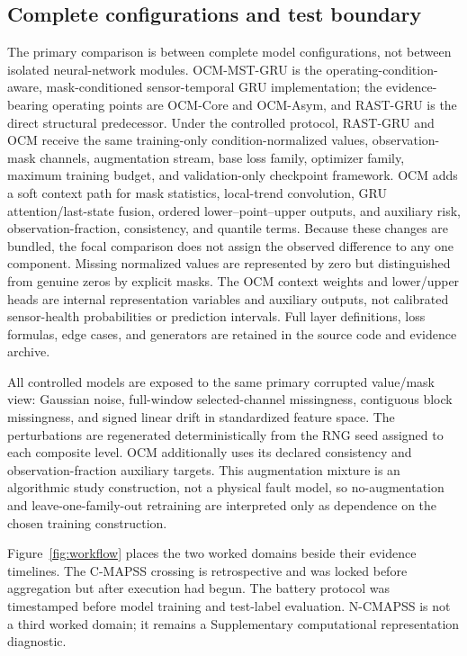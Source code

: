 \documentclass[preprint,12pt,numbers,sort&compress]{elsarticle}
\begin{document}
\subsection{Complete configurations and test boundary}

The primary comparison is between complete model configurations, not between isolated neural-network modules. OCM-MST-GRU is the operating-condition-aware, mask-conditioned sensor-temporal GRU implementation; the evidence-bearing operating points are OCM-Core and OCM-Asym, and RAST-GRU is the direct structural predecessor. Under the controlled protocol, RAST-GRU and OCM receive the same training-only condition-normalized values, observation-mask channels, augmentation stream, base loss family, optimizer family, maximum training budget, and validation-only checkpoint framework. OCM adds a soft context path for mask statistics, local-trend convolution, GRU attention/last-state fusion, ordered lower--point--upper outputs, and auxiliary risk, observation-fraction, consistency, and quantile terms. Because these changes are bundled, the focal comparison does not assign the observed difference to any one component. Missing normalized values are represented by zero but distinguished from genuine zeros by explicit masks. The OCM context weights and lower/upper heads are internal representation variables and auxiliary outputs, not calibrated sensor-health probabilities or prediction intervals. Full layer definitions, loss formulas, edge cases, and generators are retained in the source code and evidence archive.

All controlled models are exposed to the same primary corrupted value/mask view: Gaussian noise, full-window selected-channel missingness, contiguous block missingness, and signed linear drift in standardized feature space. The perturbations are regenerated deterministically from the RNG seed assigned to each composite level. OCM additionally uses its declared consistency and observation-fraction auxiliary targets. This augmentation mixture is an algorithmic study construction, not a physical fault model, so no-augmentation and leave-one-family-out retraining are interpreted only as dependence on the chosen training construction.

Figure~\ref{fig:workflow} places the two worked domains beside their evidence timelines. The C-MAPSS crossing is retrospective and was locked before aggregation but after execution had begun. The battery protocol was timestamped before model training and test-label evaluation. N-CMAPSS is not a third worked domain; it remains a Supplementary computational representation diagnostic.
\end{document}
